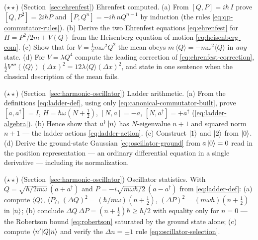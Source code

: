 \begin{problemset}
\item ($\star\star$) (Section~\ref{sec:ehrenfest}) Ehrenfest computed. (a) From $[Q, P] = i\hbar\,I$ prove $[Q, P^2] = 2i\hbar P$ and $[P, Q^n] = -i\hbar\,nQ^{n-1}$ by induction (the rules \eqref{eq:qp-commutator-rules}). (b) Derive the two Ehrenfest equations \eqref{eq:ehrenfest} for $H = P^2/2m + V(Q)$ from the Heisenberg equation of motion \eqref{eq:heisenberg-eom}. (c) Show that for $V = \tfrac12 m\omega^2 Q^2$ the mean obeys $m\,\ddot{\langle Q\rangle} = -m\omega^2\langle Q\rangle$ in \emph{any} state. (d) For $V = \lambda Q^4$ compute the leading correction of \eqref{eq:ehrenfest-correction}, $\tfrac12 V'''(\langle Q\rangle)\,(\Delta x)^2 = 12\lambda\langle Q\rangle(\Delta x)^2$, and state in one sentence when the classical description of the mean fails.

\item ($\star\star$) (Section~\ref{sec:harmonic-oscillator}) Ladder arithmetic. (a) From the definitions \eqref{eq:ladder-def}, using only \eqref{eq:canonical-commutator-built}, prove $[a, a^\dagger] = I$, $H = \hbar\omega(N + \tfrac12)$, $[N, a] = -a$, $[N, a^\dagger] = +a^\dagger$ (\eqref{eq:ladder-algebra}). (b) Hence show that $a^\dagger\ket{n}$ has $N$-eigenvalue $n + 1$ and squared norm $n + 1$ --- the ladder actions \eqref{eq:ladder-action}. (c) Construct $\ket{1}$ and $\ket{2}$ from $\ket{0}$. (d) Derive the ground-state Gaussian \eqref{eq:oscillator-ground} from $a\ket{0} = 0$ read in the position representation --- an ordinary differential equation in a single derivative --- including its normalization.

\item ($\star\star$) (Section~\ref{sec:harmonic-oscillator}) Oscillator statistics. With $Q = \sqrt{\hbar/2m\omega}\,(a + a^\dagger)$ and $P = -i\sqrt{m\omega\hbar/2}\,(a - a^\dagger)$ from \eqref{eq:ladder-def}: (a) compute $\langle Q\rangle$, $\langle P\rangle$, $(\Delta Q)^2 = (\hbar/m\omega)(n + \tfrac12)$, $(\Delta P)^2 = (m\omega\hbar)(n + \tfrac12)$ in $\ket{n}$; (b) conclude $\Delta Q\,\Delta P = (n + \tfrac12)\hbar \geq \hbar/2$ with equality only for $n = 0$ --- the Robertson bound \eqref{eq:robertson} saturated by the ground state alone; (c) compute $\braket{n'|Q|n}$ and verify the $\Delta n = \pm1$ rule \eqref{eq:oscillator-selection}.


\end{problemset}

